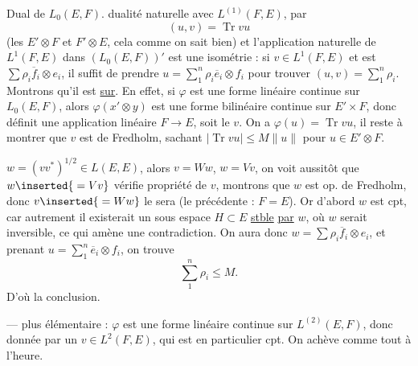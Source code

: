 Dual de $L_0(E,F)$.   dualité \deleted{\unsure{\ldots}} naturelle avec $L^{(1)}(F,E)$,  par
\[
\boxed{(u,v)=\operatorname{Tr}vu}
\]
(les $E'\otimes F$ et $F'\otimes E$, cela comme on sait bien)
et l'application naturelle de $L^1(F,E)$ dans $(L_0(E,F))'$ est une isométrie : si $v\in L^1(F,E)$ et est $\sum\rho_i\overline f_i\otimes e_i$, il suffit de prendre $u=\sum_1^n\rho_i\overline e_i\otimes f_i$ pour trouver $(u,v)=\sum_1^n\rho_i$.
Montrons qu'il est \uline{sur}. En effet, si $\varphi$ est une forme linéaire continue sur $L_0(E,F)$, alors $\varphi(x'\otimes y)$ est une forme bilinéaire continue sur $E'\times F$, donc définit une application linéaire $F\longrightarrow E$, soit le $v$. On a $\varphi(u)=\operatorname{Tr}vu$, il reste à montrer que $v$ est de Fredholm, sachant $|\operatorname{Tr}vu|\leq M\|u\|$ pour $u\in E'\otimes F$.


$w=(vv^*)^{1/2}\in L(E,E)$, alors $v=Ww$, $w=Vv$, on voit aussitôt que $w\inserted{{}=Vv}$  vérifie propriété de $v$, montrons que $w$ est op. de Fredholm, donc $v\inserted{{}=Ww}$ le sera (le précédente : $F=E$).
Or  d'abord $w$ est cpt, car autrement il existerait un sous espace $H\subset E$ \uline{stble}  \uline{par}  $w$, où $w$ serait inversible, ce qui amène une contradiction.
On aura donc $w=\sum\rho_i\overline f_i\otimes e_i$, et prenant $u=\sum_1^n\overline e_i\otimes f_i$, on trouve
\[
\sum_1^n\rho_i\leq M.
\]
D'où la conclusion.

---   plus élémentaire : $\varphi$ est une forme linéaire continue sur $L^{(2)}(E,F)$, donc donnée par un $v\in L^2(F,E)$, qui est en particulier cpt. On achève comme tout à l'heure.
